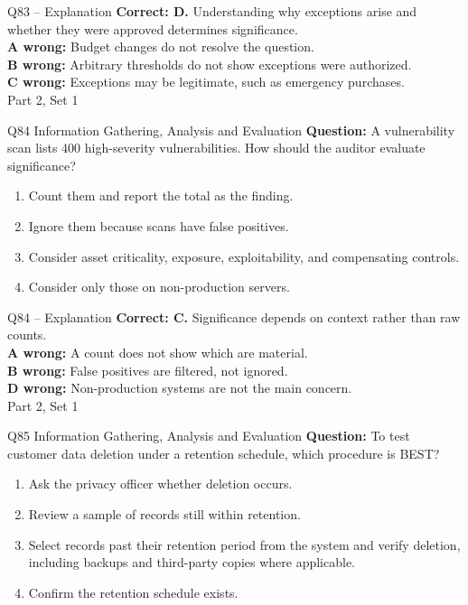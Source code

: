 \documentclass[aspectratio=169,10pt]{beamer}
\begin{document}
\begin{frame}[t]{Q83 -- Explanation}
	\footnotesize
	\textbf{Correct: D.} Understanding why exceptions arise and whether they were approved determines significance. \\[5pt]
\textbf{A wrong:} Budget changes do not resolve the question. \\[3pt]
\textbf{B wrong:} Arbitrary thresholds do not show exceptions were authorized. \\[3pt]
\textbf{C wrong:} Exceptions may be legitimate, such as emergency purchases. \\[3pt]
	\vfill {\tiny Part 2, Set 1}
\end{frame}
\begin{frame}[t]{Q84 \hfill {\scriptsize Information Gathering, Analysis and Evaluation}}
	\small
	\textbf{Question:} A vulnerability scan lists 400 high-severity vulnerabilities. How should the auditor evaluate significance?
	\begin{enumerate}[label=\Alph*.,itemsep=1pt,topsep=3pt]
			\item Count them and report the total as the finding.
			\item Ignore them because scans have false positives.
			\item Consider asset criticality, exposure, exploitability, and compensating controls.
			\item Consider only those on non-production servers.
	\end{enumerate}
\end{frame}
\begin{frame}[t]{Q84 -- Explanation}
	\footnotesize
	\textbf{Correct: C.} Significance depends on context rather than raw counts. \\[5pt]
\textbf{A wrong:} A count does not show which are material. \\[3pt]
\textbf{B wrong:} False positives are filtered, not ignored. \\[3pt]
\textbf{D wrong:} Non-production systems are not the main concern. \\[3pt]
	\vfill {\tiny Part 2, Set 1}
\end{frame}
\begin{frame}[t]{Q85 \hfill {\scriptsize Information Gathering, Analysis and Evaluation}}
	\small
	\textbf{Question:} To test customer data deletion under a retention schedule, which procedure is BEST?
	\begin{enumerate}[label=\Alph*.,itemsep=1pt,topsep=3pt]
			\item Ask the privacy officer whether deletion occurs.
			\item Review a sample of records still within retention.
			\item Select records past their retention period from the system and verify deletion, including backups and third-party copies where applicable.
			\item Confirm the retention schedule exists.
	\end{enumerate}
\end{frame}
\end{document}
